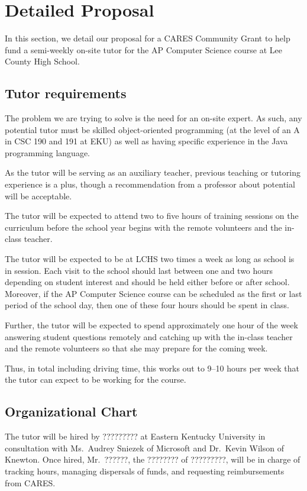 \section{Detailed Proposal}\label{sec:proposal}

In this section, we detail our proposal for a CARES Community Grant to help
fund a semi-weekly on-site tutor for the AP Computer Science course at
Lee County High School.

\subsection{Tutor requirements}\label{ssec:tutor}

The problem we are trying to solve is the need for an on-site expert. As such,
any potential tutor must be skilled object-oriented programming (at the level
of an A in CSC 190 and 191 at EKU) as well as having specific experience in
the Java programming language.

As the tutor will be serving as an auxiliary teacher, previous teaching or
tutoring experience is a plus, though a recommendation from a professor
about potential will be acceptable.

The tutor will be expected to attend two to five hours of training sessions
on the curriculum before the school year begins with the remote volunteers
and the in-class teacher.

The tutor will be expected to be at LCHS two times a week as long as school is
in session. Each visit to the school should last between one and two hours
depending on student interest and should be held either before or after school.
Moreover, if the AP Computer Science course can be scheduled as the first or
last period of the school day, then one of these four hours should be spent
in class.

Further, the tutor will be expected to spend approximately one hour of the week
answering student questions remotely and catching up with the in-class teacher
and the remote volunteers so that she may prepare for the coming week.

Thus, in total including driving time, this works out to 9--10 hours per week
that the tutor can expect to be working for the course.

\subsection{Organizational Chart}\label{ssec:orgchart}

The tutor will be hired by ????????? at Eastern Kentucky University in
consultation with Ms.~Audrey Sniezek of Microsoft and Dr.~Kevin Wilson
of Knewton. Once hired, Mr.~??????, the ???????? of ?????????, will be in charge
of tracking hours, managing dispersals of funds, and requesting reimbursements
from CARES.

